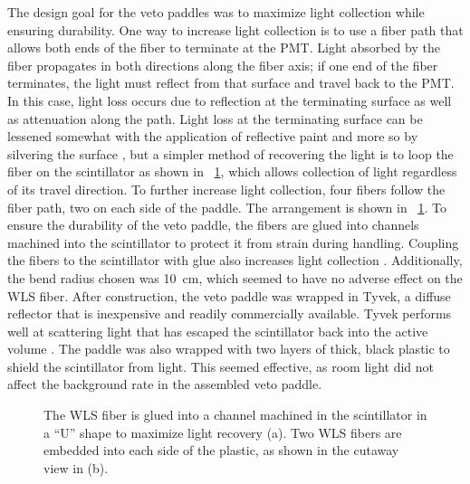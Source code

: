 The design goal for the veto paddles was to maximize light collection while ensuring durability.  One way to increase light collection is to use a fiber path that allows both ends of the fiber to terminate at the PMT.  Light absorbed by the fiber propagates in both directions along the fiber axis; if one end of the fiber terminates, the light must reflect from that surface and travel back to the PMT.  In this case, light loss occurs due to reflection at the terminating surface as well as attenuation along the path.  Light loss at the terminating surface can be lessened somewhat with the application of reflective paint and more so by silvering the surface \cite{WLS_mirrorFinish}, but a simpler method of recovering the light is to loop the fiber on the scintillator as shown in {\fig}~\ref{fig:paddle}, which allows collection of light regardless of its travel direction.  To further increase light collection, four fibers follow the fiber path, two on each side of the paddle.  The arrangement is shown in {\fig}~\ref{fig:paddle}.  To ensure the durability of the veto paddle, the fibers are glued into channels machined into the scintillator to protect it from strain during handling.  Coupling the fibers to the scintillator with glue also increases light collection \cite{Aguillion_scintTiles}.  Additionally, the bend radius chosen was 10~cm, which seemed to have no adverse effect on the WLS fiber.  After construction, the veto paddle was wrapped in Tyvek, a diffuse reflector that is inexpensive and readily commercially available.  Tyvek performs well at scattering light that has escaped the scintillator back into the active volume \cite{YongWeiTyvek}.  The paddle was also wrapped with two layers of thick, black plastic to shield the scintillator from light.  This seemed effective, as room light did not affect the background rate in the assembled veto paddle.  
\begin{figure}[!htbp]
\centering
{}
\caption{The WLS fiber is glued into a channel machined in the scintillator in a ``U'' shape to maximize light recovery (a).  Two WLS fibers are embedded into each side of the plastic, as shown in the cutaway view in (b).}
\label{fig:paddle}
\end{figure}

